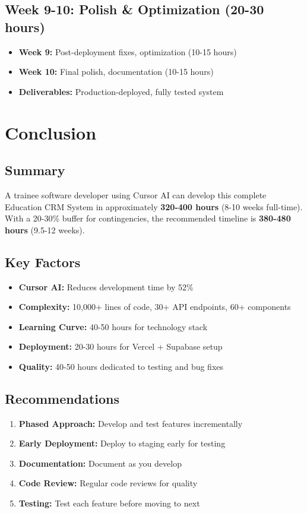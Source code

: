 \documentclass[11pt,a4paper]{article}
\begin{document}
\subsection{Week 9-10: Polish \& Optimization (20-30 hours)}
\begin{itemize}
    \item \textbf{Week 9:} Post-deployment fixes, optimization (10-15 hours)
    \item \textbf{Week 10:} Final polish, documentation (10-15 hours)
    \item \textbf{Deliverables:} Production-deployed, fully tested system
\end{itemize}

\newpage

\section{Conclusion}

\subsection{Summary}
A trainee software developer using Cursor AI can develop this complete Education CRM System in approximately \textbf{320-400 hours} (8-10 weeks full-time). With a 20-30\% buffer for contingencies, the recommended timeline is \textbf{380-480 hours} (9.5-12 weeks).

\subsection{Key Factors}
\begin{itemize}
    \item \textbf{Cursor AI:} Reduces development time by 52\%
    \item \textbf{Complexity:} 10,000+ lines of code, 30+ API endpoints, 60+ components
    \item \textbf{Learning Curve:} 40-50 hours for technology stack
    \item \textbf{Deployment:} 20-30 hours for Vercel + Supabase setup
    \item \textbf{Quality:} 40-50 hours dedicated to testing and bug fixes
\end{itemize}

\subsection{Recommendations}
\begin{enumerate}
    \item \textbf{Phased Approach:} Develop and test features incrementally
    \item \textbf{Early Deployment:} Deploy to staging early for testing
    \item \textbf{Documentation:} Document as you develop
    \item \textbf{Code Review:} Regular code reviews for quality
    \item \textbf{Testing:} Test each feature before moving to next
\end{enumerate}
\end{document}
